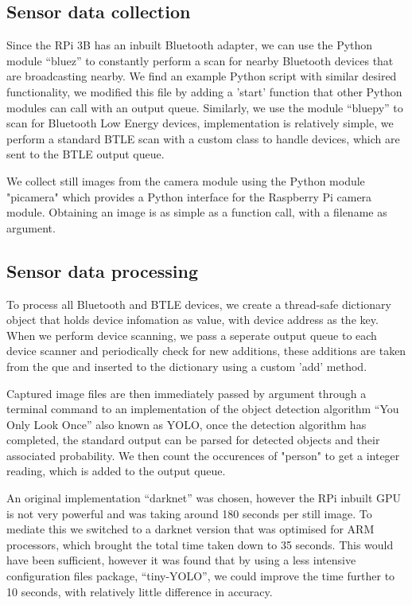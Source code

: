 \documentclass{l4proj}
\begin{document}
\subsection{Sensor data collection}
Since the RPi 3B has an inbuilt Bluetooth adapter, we can use the Python module “bluez” to constantly perform a scan for nearby Bluetooth devices that are broadcasting nearby. We find an example Python script with similar desired functionality, we modified this file by adding a 'start' function that other Python modules can call with an output queue. Similarly, we use the module “bluepy” to scan for Bluetooth Low Energy devices, implementation is relatively simple, we perform a standard BTLE scan with a custom class to handle devices, which are sent to the BTLE output queue. 

We collect still images from the camera module using the Python module "picamera" which provides a Python interface for the Raspberry Pi camera module. Obtaining an image is as simple as a function call, with a filename as argument.


\subsection{Sensor data processing}
To process all Bluetooth and BTLE devices, we create a thread-safe dictionary object that holds device infomation as value, with device address as the key. When we perform device scanning, we pass a seperate output queue to each device scanner and periodically check for new additions, these additions are taken from the que and inserted to the dictionary using a custom 'add' method.

Captured image files are then immediately passed by argument through a terminal command to an implementation of the object detection algorithm “You Only Look Once” also known as YOLO, once the detection algorithm has completed, the standard output can be parsed for detected objects and their associated probability. We then count the occurences of "person" to get a integer reading, which is added to the output queue.

An original implementation “darknet” was chosen, however the RPi inbuilt GPU is not very powerful and was taking around 180 seconds per still image. To mediate this we switched to a darknet version that was optimised for ARM processors, which brought the total time taken down to 35 seconds. This would have been sufficient, however it was found that by using a less intensive configuration files package,  “tiny-YOLO”, we could improve the time further to 10 seconds, with relatively little difference in accuracy.
\end{document}
